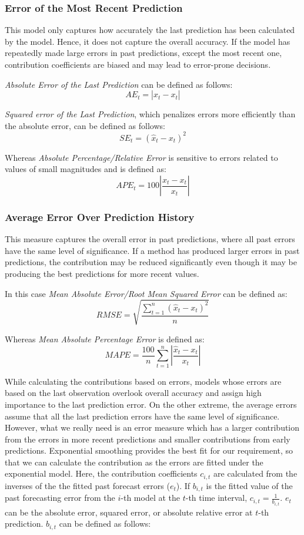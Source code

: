 \subsubsection{Error of the Most Recent Prediction}
This model only captures how accurately the last prediction has been calculated by the model. Hence, it does not capture the overall accuracy. If the model has repeatedly made large errors in past predictions, except the most recent one, contribution coefficients are biased and may lead to error-prone decisions.

\noindent
\textit{Absolute Error of the Last Prediction} can be defined as follows:
$$AE_t=|\hat{x}_t-x_t|$$

\noindent
\textit{Squared error of the Last Prediction}, which penalizes errors more efficiently than the absolute error, can be defined as follows:
$$SE_t=(\hat{x}_t-x_t)^2$$

\noindent
Whereas \textit{Absolute Percentage/Relative Error} is sensitive to errors related to values of small magnitudes and is defined as:
$$APE_t=100\left |\frac{\hat{x}_t-x_t}{x_t}  \right |$$

\subsubsection{Average Error Over Prediction History}
This measure captures the overall error in past predictions, where all past errors have the same level of significance. If a method has produced larger errors in past predictions, the contribution may be reduced significantly even though it may be producing the best predictions for more recent values.

\noindent
In this case \textit{Mean Absolute Error/Root Mean Squared Error} can be defined as:
$$RMSE=\sqrt{\frac{\sum_{t=1}^{n}(\hat{x}_{t}-x_{t})^{2}}{n}}$$ 

\noindent
Whereas \textit{Mean Absolute Percentage Error} is defined as:
$$MAPE=\frac{100}{n}\sum_{t=1}^{n}\left | \frac{\hat{x}_{t}-x_{t}}{x_{t}} \right |$$

While calculating the contributions based on errors, models whose errors are based on the last observation overlook overall accuracy and assign high importance to the last prediction error. On the other extreme, the average errors assume that all the last prediction errors have the same level of significance. However, what we really need is an error measure which has a larger contribution from the errors in more recent predictions and smaller contributions from early predictions. Exponential smoothing provides the best fit for our requirement, so that we can calculate the contribution as the errors are fitted under the exponential model. Here, the contribution coefficients $c_{i,t}$ are calculated from the inverses of the the fitted past forecast errors ($e_{t}$). If $b_{i,t}$ is the fitted value of the past forecasting error from the $i$-th model at the $t$-th time interval, $c_{i,t}=\frac{1}{b_{i,t}}$. $e_{t}$ can be the absolute error, squared error, or absolute relative error at $t$-th prediction. $b_{i,t}$ can be defined as follows:

